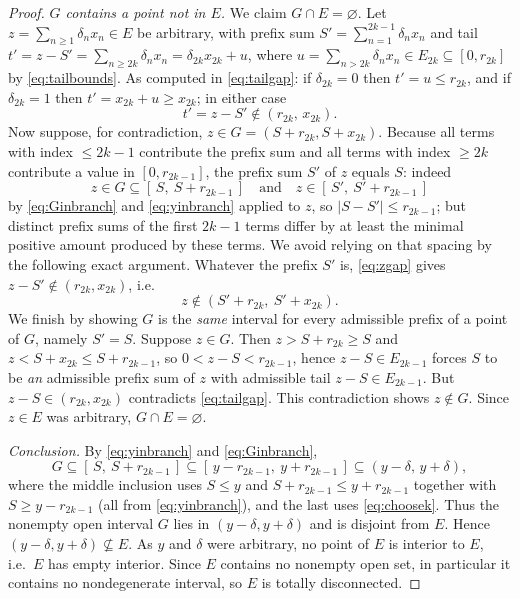 \documentclass{amsart}
\theoremstyle{definition}
\begin{document}
\begin{proof}
\emph{$G$ contains a point not in $E$.} We claim $G\cap E=\varnothing$. Let
$z=\sum_{n\ge1}\delta_n x_n\in E$ be arbitrary, with prefix sum
$S'=\sum_{n=1}^{2k-1}\delta_n x_n$ and tail
$t'=z-S'=\sum_{n\ge 2k}\delta_n x_n=\delta_{2k}x_{2k}+u$, where
$u=\sum_{n>2k}\delta_n x_n\in E_{2k}\subseteq[0,r_{2k}]$ by \eqref{eq:tailbounds}. As computed
in \eqref{eq:tailgap}: if $\delta_{2k}=0$ then $t'=u\le r_{2k}$, and if $\delta_{2k}=1$ then
$t'=x_{2k}+u\ge x_{2k}$; in either case
\begin{equation}\label{eq:zgap}
t'=z-S'\notin(r_{2k},\,x_{2k}).
\end{equation}
Now suppose, for contradiction, $z\in G=(S+r_{2k},S+x_{2k})$. Because all terms with index
$\le 2k-1$ contribute the prefix sum and all terms with index $\ge 2k$ contribute a value in
$[0,r_{2k-1}]$, the prefix sum $S'$ of $z$ equals $S$: indeed
$$z\in G\subseteq[\,S,\ S+r_{2k-1}\,]\quad\text{and}\quad z\in[\,S',\ S'+r_{2k-1}\,]$$
by \eqref{eq:Ginbranch} and \eqref{eq:yinbranch} applied to $z$, so
$|S-S'|\le r_{2k-1}$; but distinct prefix sums of the first $2k-1$ terms differ by at least the
minimal positive amount produced by these terms. We avoid relying on that spacing by the
following exact argument. Whatever the prefix $S'$ is, \eqref{eq:zgap} gives
$z-S'\notin(r_{2k},x_{2k})$, i.e.
\begin{equation}\label{eq:keystep}
z\notin(S'+r_{2k},\ S'+x_{2k}).
\end{equation}
We finish by showing $G$ is the \emph{same} interval for every admissible prefix of a point
of $G$, namely $S'=S$. Suppose $z\in G$. Then
$z>S+r_{2k}\ge S$ and $z<S+x_{2k}\le S+r_{2k-1}$, so $0< z-S< r_{2k-1}$, hence $z-S\in E_{2k-1}$
forces $S$ to be \emph{an} admissible prefix sum of $z$ with admissible tail $z-S\in E_{2k-1}$.
But $z-S\in(r_{2k},x_{2k})$ contradicts \eqref{eq:tailgap}. This contradiction shows
$z\notin G$. Since $z\in E$ was arbitrary, $G\cap E=\varnothing$.

\emph{Conclusion.} By \eqref{eq:yinbranch} and \eqref{eq:Ginbranch},
$$G\subseteq[\,S,\ S+r_{2k-1}\,]\subseteq[\,y-r_{2k-1},\ y+r_{2k-1}\,]\subseteq(y-\delta,\,y+\delta),$$
where the middle inclusion uses $S\le y$ and $S+r_{2k-1}\le y+r_{2k-1}$ together with
$S\ge y-r_{2k-1}$ (all from \eqref{eq:yinbranch}), and the last uses \eqref{eq:choosek}.
Thus the nonempty open interval $G$ lies in $(y-\delta,y+\delta)$ and is disjoint from $E$.
Hence $(y-\delta,y+\delta)\not\subseteq E$. As $y$ and $\delta$ were arbitrary, no point of $E$
is interior to $E$, i.e.\ $E$ has empty interior. Since $E$ contains no nonempty open set, in
particular it contains no nondegenerate interval, so $E$ is totally disconnected.
\end{proof}
\end{document}
